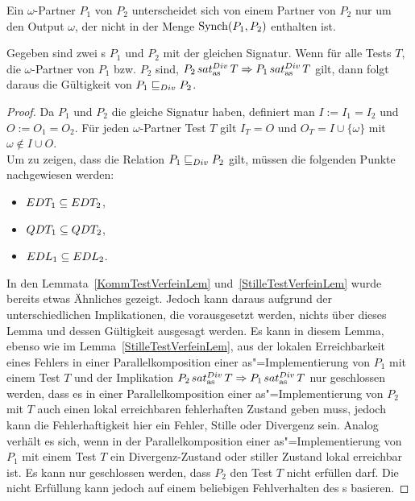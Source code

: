 Ein $\omega$-Partner $P_1$ von $P_2$ unterscheidet sich von einem Partner von
$P_2$ nur um den Output $\omega$, der nicht in der Menge $\mathrm{Synch} (P_1,P_2)$
enthalten ist.

\begin{Lem}
  \label{DivTestVerfeinLem}
  Gegeben sind zwei \MEIO{}s $P_1$ und $P_2$ mit der gleichen Signatur. Wenn
  für alle Tests $T$, die $\omega$-Partner von $P_1$ bzw. $P_2$ sind, $P_2
  \hspace{0.05cm}sat_\mathrm{as}^{Div}\hspace{0.05cm} T\Rightarrow P_1 \hspace{0.05cm}sat_\mathrm{as}^{Div}\hspace{0.05cm} T$ gilt, dann folgt daraus die Gültigkeit
  von $P_1 \sqsubseteq  _{Div} P_2$.
\end{Lem}
\begin{proof}
  Da $P_1$ und $P_2$ die gleiche Signatur haben, definiert man $I:=I_1=I_2$ und
  $O:=O_1=O_2$. Für jeden $\omega$-Partner Test $T$ gilt $I_T=O$ und
  $O_T=I\cup\{\omega\}$ mit $\omega\notin I\cup O$.\\
  Um zu zeigen, dass die Relation $P_1 \sqsubseteq  _{Div} P_2$ gilt, müssen die folgenden
  Punkte nachgewiesen werden:
  \begin{itemize}
    \item $EDT _1\subseteq EDT _2$,
    \item $QDT _1\subseteq QDT _2$,
    \item $EDL _1\subseteq EDL _2$.
  \end{itemize}
  In den Lemmata~\ref{KommTestVerfeinLem} und~\ref{StilleTestVerfeinLem} wurde
  bereits etwas Ähnliches gezeigt. Jedoch kann daraus aufgrund der
  unterschiedlichen Implikationen, die vorausgesetzt werden, nichts über dieses
  Lemma und dessen Gültigkeit ausgesagt werden. Es kann in diesem Lemma, ebenso
  wie im Lemma~\ref{StilleTestVerfeinLem}, aus der lokalen Erreichbarkeit eines
  Fehlers in einer Parallelkomposition einer as"=Implementierung von $P_1$ mit
  einem Test $T$ und der Implikation $P_2 \hspace{0.05cm}sat_\mathrm{as}^{Div}\hspace{0.05cm} T\Rightarrow P_1 \hspace{0.05cm}sat_\mathrm{as}^{Div}\hspace{0.05cm} T$
  nur geschlossen werden, dass es in einer Parallelkomposition einer
  as"=Implementierung von $P_2$ mit $T$ auch einen lokal erreichbaren
  fehlerhaften Zustand geben muss, jedoch kann die Fehlerhaftigkeit hier ein
  Fehler, Stille oder Divergenz sein. Analog verhält es sich, wenn in der
  Parallelkomposition einer as"=Implementierung von $P_1$ mit einem Test $T$
  ein Divergenz-Zustand oder stiller Zustand lokal erreichbar ist. Es kann nur
  geschlossen werden, dass $P_2$ den Test $T$ nicht erfüllen darf. Die nicht
  Erfüllung kann jedoch auf einem beliebigen Fehlverhalten des \MEIO{}s
  basieren.


\end{proof}
